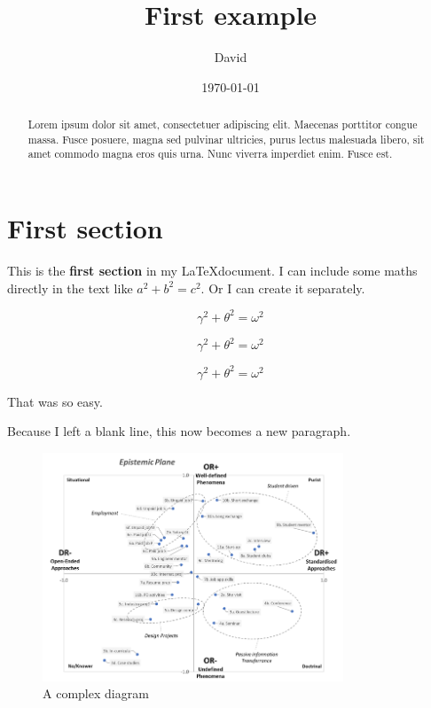 \documentclass[12pt]{article}
\title{First example}
\author{David}
\date{\today}
\begin{document}
   \maketitle %
    
   \begin{abstract}
      Lorem ipsum dolor sit amet, consectetuer adipiscing elit. Maecenas porttitor congue massa. Fusce posuere, magna sed pulvinar ultricies, purus lectus malesuada libero, sit amet commodo magna eros quis urna. Nunc viverra imperdiet enim. Fusce est.
   \end{abstract}

   \section{First section}
    
   This is the \textbf{first section} in my \LaTeX document.
   I can include some maths directly in the text like $a^2+b^2=c^2$. Or I can create it separately.

   \begin{equation}
      \gamma^2+\theta^2=\omega^2
   \end{equation}

   \begin{equation}
      \gamma^2+\theta^2=\omega^2
   \end{equation}

   \begin{equation}
      \label{stuff}
      \gamma^2+\theta^2=\omega^2
   \end{equation}

   That was so easy.
	
   Because I left a          blank line, this now
   becomes a new paragraph.

   \begin{figure}[t]
   \caption{A complex diagram}
      \centering
      \includegraphics[width=0.8\textwidth]{fig1}
   \end{figure}
\end{document}
